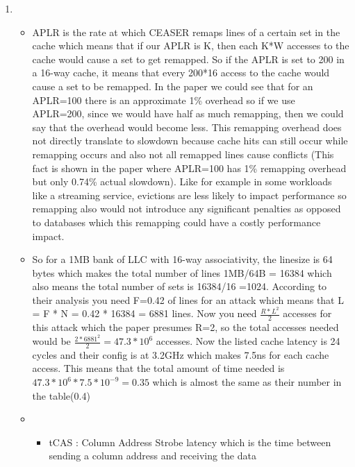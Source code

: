 \begin{enumerate}
\begin{enumerate}
\begin{itemize}
    \end{itemize}


\end{enumerate}
    \item  \begin{itemize}
        \item APLR is the rate at which CEASER remaps lines of a certain set in the cache which means that if our APLR is K, then each K*W accesses to the cache would cause a set to get remapped. 
        So if the APLR is set to 200 in a 16-way cache, it means that every 200*16 access to the cache would cause a set to be remapped. In the paper we could see that for an APLR=100 there is an approximate 1\% 
        overhead so if we use APLR=200, since we would have half as much remapping, then we could say that the overhead would become less. This remapping overhead does not directly translate to slowdown because cache hits can still occur while remapping occurs 
        and also not all remapped lines cause conflicts (This fact is shown in the paper where APLR=100 has 1\% remapping overhead but only 0.74\% actual slowdown). Like for example in some workloads like a streaming service, evictions are less likely to impact performance so remapping also would not introduce any significant penalties as opposed to 
        databases which this remapping could have a costly performance impact.

        \item So for a 1MB bank of LLC with 16-way associativity, the linesize is 64 bytes which makes the total number of lines 1MB/64B = 16384
        which also means the total number of sets is 16384/16 =1024. According to their analysis you need F=0.42 of lines for an attack which means that L = F * N = 0.42 * 16384 = 6881 lines. 
        Now you need $\frac{R * L^{2}}{2}$ accesses for this attack which the paper presumes R=2, so the total accesses needed would be $\frac{2 * 6881^{2}}{2} = 47.3 * 10^{6}$ accesses. 
        Now the listed cache latency is 24 cycles and their config is at 3.2GHz which makes 7.5ns for each cache access. This means that 
        the total amount of time needed is $47.3*10^{6}*7.5*10^{-9}=0.35$ which is almost the same as their number in the table(0.4)

        \item \begin{itemize}
            \item tCAS : Column Address Strobe latency which is the time between sending a column address and 
            receiving the data


\end{itemize}
\end{itemize}
\end{enumerate}

